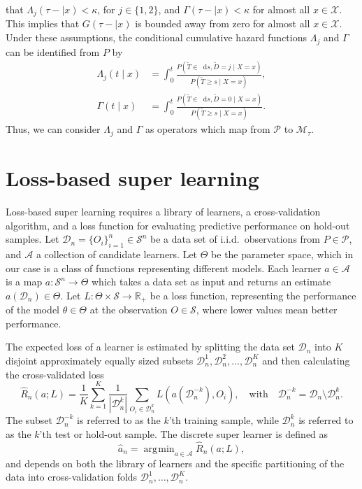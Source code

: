 \documentclass[alpha-refs]{wiley-article}
\newcommand{\R}{\mathbb{R}}
\newcommand*\diff{\mathop{}\!\mathrm{d}}
\newcommand{\1}{\mathbb{1}}
\DeclareMathOperator*{\argmin}{\arg\!\min}
\newcommand{\data}{\ensuremath{\mathcal{D}}}
\newcommand{\sample}{\ensuremath{\mathcal{S}}}
\begin{document}
that \(\Lambda_{j}(\tau- \mid x)<\kappa \), for \(j\in\{1,2\}\), and
\(\Gamma(\tau- \mid x)<\kappa\) for almost all \(x\in\mathcal
X\). This implies that \(G(\tau- \mid x)\) is bounded away
from zero for almost all \(x\in\mathcal X\).  Under these assumptions,
the conditional cumulative hazard functions \(\Lambda_{j}\) and
\(\Gamma\) can be identified from \(P\) by
\begin{align}
  \Lambda_{j}(t \mid x) &= \int_0^t\frac{  P(\tilde T \in \diff s, \tilde D=j \mid X=x )}{P(\tilde T \geq s \mid X=x )}, \label{eq:lambdaj}\\
  \Gamma(t \mid x) &= \int_0^t\frac{  P(\tilde T \in \diff s, \tilde D=0 \mid X=x )}{P(\tilde T \geq s \mid X=x )}\label{eq:gamma}.
\end{align}
Thus, we can consider $\Lambda_j$ and \(\Gamma\) as operators which map from
\( \mathcal{P} \) to \(\mathcal M_{\tau}\).

\section{Loss-based super learning}
\label{sec:super-learning}

Loss-based super learning requires a library of learners, a
cross-validation algorithm, and a loss function for evaluating
predictive performance on hold-out samples. Let \(
\data_n=\{O_i\}_{i=1}^n \in \sample^n \) be a data set of i.i.d.\
observations from \( P \in \mathcal{P} \), and $\mathcal{A}$ a
collection of candidate learners. Let \(\Theta\) be the parameter
space, which in our case is a class of functions representing
different models. Each learner \(a \in \mathcal{A}\) is a map \( a
\colon \sample^n \rightarrow \Theta \) which takes a data set as
input and returns an estimate $a(\data_n) \in \Theta$. Let \(L\colon
\Theta \times \sample \rightarrow \R_+\) be a loss function,
representing the performance of the model $\theta \in \Theta$ at the
observation \( O \in \sample \), where lower values mean better
performance.

The expected loss of a learner is estimated by splitting the data set
$\data_n$ into $K$ disjoint approximately equally sized subsets
\(\data_n^1, \data_n^2, \dots, \data_n^K \) and then calculating the
cross-validated loss
\begin{equation}
  \label{eq:cv-risk-est}
  \hat{R}_n(a; L) =
  \frac{1}{K}\sum_{k=1}^{K}
  \frac{1}{| \data_n^{k} |}\sum_{O_i \in \data_n^{k}}
  L
  {
    \left(
      a{ (\data_n^{-k})}
      , O_i
    \right)
  },
  \quad \text{with} \quad
  \data_n^{-k} = \data_n \setminus \data_n^{k}.
\end{equation}
The subset \(\data_n^{-k}\) is referred to as the \(k\)'th training
sample, while \(\data_n^{k}\) is referred to as the \(k\)'th test or
hold-out sample.
The discrete super learner is defined as
\begin{equation*}
\hat{a}_n = \argmin_{a\in\mathcal A}\hat{R}_n(a; L),
\end{equation*}
and depends on both the library of learners and the specific
partitioning of the data into cross-validation folds
\( \data_n^1, \dots, \data_n^K \).
\end{document}
